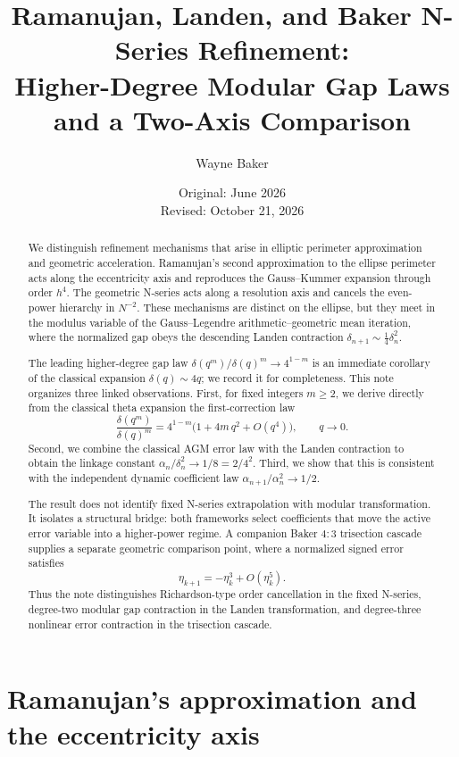 \documentclass[11pt]{article}
\title{Ramanujan, Landen, and Baker N-Series Refinement:\\
Higher-Degree Modular Gap Laws and a Two-Axis Comparison}
\author{Wayne Baker}
\date{Original: June 2026\\Revised: October 21, 2026}
\begin{document}
\maketitle

\begin{abstract}
We distinguish refinement mechanisms that arise in elliptic perimeter
approximation and geometric acceleration. Ramanujan's second approximation to
the ellipse perimeter acts along the eccentricity axis and reproduces the
Gauss--Kummer expansion through order $h^4$. The geometric N-series acts along a
resolution axis and cancels the even-power hierarchy in $N^{-2}$. These
mechanisms are distinct on the ellipse, but they meet in the modulus variable of
the Gauss--Legendre arithmetic--geometric mean iteration, where the normalized
gap obeys the descending Landen contraction
$\delta_{n+1}\sim\tfrac14\delta_n^2$.

The leading higher-degree gap law
$\delta(q^m)/\delta(q)^m\to4^{1-m}$ is an immediate corollary of the classical
expansion $\delta(q)\sim4q$; we record it for completeness. This note organizes three linked observations. First, for fixed integers $m\ge2$,
we derive directly from the classical theta expansion the first-correction law
\[
\frac{\delta(q^m)}{\delta(q)^m}
=
4^{1-m}\bigl(1+4m\,q^2+O(q^4)\bigr),
\qquad q\to0.
\]
Second, we combine the classical AGM error law with the Landen contraction to
obtain the linkage constant
$\alpha_n/\delta_n^2\to1/8=2/4^2$. Third, we show that this is consistent with
the independent dynamic coefficient law
$\alpha_{n+1}/\alpha_n^2\to1/2$.

The result does not identify fixed N-series extrapolation with modular
transformation. It isolates a structural bridge: both frameworks select
coefficients that move the active error variable into a higher-power regime. A
companion Baker $4{:}3$ trisection cascade supplies a separate geometric
comparison point, where a normalized signed error satisfies
\[
\eta_{k+1}=-\eta_k^3+O(\eta_k^5).
\]
Thus the note distinguishes Richardson-type order cancellation in the fixed
N-series, degree-two modular gap contraction in the Landen transformation, and
degree-three nonlinear error contraction in the trisection cascade.
\end{abstract}

\section{Ramanujan's approximation and the eccentricity axis}
\end{document}
